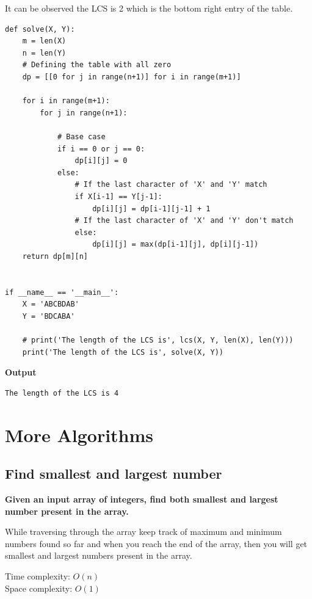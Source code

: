 \documentclass[a4paper,11pt]{book}
\begin{document}
\noindent It can be observed the LCS is 2 which is the bottom right entry of the table.

\begin{lstlisting}
def solve(X, Y):
    m = len(X)
    n = len(Y)
    # Defining the table with all zero
    dp = [[0 for j in range(n+1)] for i in range(m+1)]

    for i in range(m+1):
        for j in range(n+1):

            # Base case
            if i == 0 or j == 0:
                dp[i][j] = 0
            else:
                # If the last character of 'X' and 'Y' match
                if X[i-1] == Y[j-1]:
                    dp[i][j] = dp[i-1][j-1] + 1
                # If the last character of 'X' and 'Y' don't match
                else:
                    dp[i][j] = max(dp[i-1][j], dp[i][j-1])
    return dp[m][n]
 
 
if __name__ == '__main__':
    X = 'ABCBDAB'
    Y = 'BDCABA'
 
    # print('The length of the LCS is', lcs(X, Y, len(X), len(Y)))
    print('The length of the LCS is', solve(X, Y))
\end{lstlisting}
\textbf{Output}
\begin{lstlisting}
The length of the LCS is 4
\end{lstlisting}



\chapter{More Algorithms}

\section{Find smallest and largest number}

\textbf{Given an input array of integers,  find both smallest and largest number present in the array.}
\vspace{5mm}

\noindent While traversing through the array keep track of maximum and minimum numbers found so far and when you reach the end of the array, then you will get smallest and largest numbers present in the array.

\vspace{5mm}

\noindent Time complexity:  $O(n)$\\
\noindent Space complexity: $O(1)$
\end{document}
